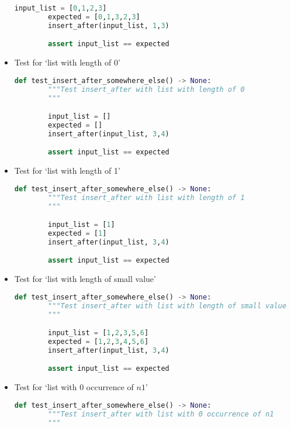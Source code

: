 \documentclass[12pt]{article}
\begin{document}
\begin{itemize}
\begin{lstlisting}[language=Python]
        input_list = [0,1,2,3]
        expected = [0,1,3,2,3]
        insert_after(input_list, 1,3)

        assert input_list == expected
    \end{lstlisting}

    \item

    Test for `list with length of 0'

    \begin{lstlisting}[language=Python]
    def test_insert_after_somewhere_else() -> None:
        """Test insert_after with list with length of 0
        """

        input_list = []
        expected = []
        insert_after(input_list, 3,4)

        assert input_list == expected
    \end{lstlisting}

    \item

    Test for `list with length of 1'

    \begin{lstlisting}[language=Python]
    def test_insert_after_somewhere_else() -> None:
        """Test insert_after with list with length of 1
        """

        input_list = [1]
        expected = [1]
        insert_after(input_list, 3,4)

        assert input_list == expected
    \end{lstlisting}

    \item

    Test for `list with length of small value'

    \begin{lstlisting}[language=Python]
    def test_insert_after_somewhere_else() -> None:
        """Test insert_after with list with length of small value
        """

        input_list = [1,2,3,5,6]
        expected = [1,2,3,4,5,6]
        insert_after(input_list, 3,4)

        assert input_list == expected
    \end{lstlisting}

    \item

    Test for `list with 0 occurrence of $n1$'

    \begin{lstlisting}[language=Python]
    def test_insert_after_somewhere_else() -> None:
        """Test insert_after with list with 0 occurrence of n1
        """


\end{lstlisting}
\end{itemize}
\end{document}
